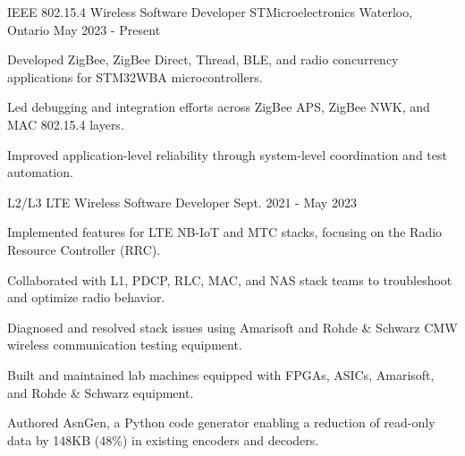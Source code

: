 
\begin{cventries}

\cventry
    {IEEE 802.15.4 Wireless Software Developer } %
    {STMicroelectronics } %
    {Waterloo, Ontario} %
    {May 2023 - Present} %
    {
      \begin{cvitems} %
        \item {Developed ZigBee, ZigBee Direct, Thread, BLE, and radio concurrency applications for STM32WBA microcontrollers.}
        \item {Led debugging and integration efforts across ZigBee APS, ZigBee NWK, and MAC 802.15.4 layers.}
        \item {Improved application-level reliability through system-level coordination and test automation.}
      \end{cvitems}
    }

  \cventry
    {L2/L3 LTE Wireless Software Developer } %
    {} %
    {} %
    {Sept. 2021 - May 2023} %
    {
      \begin{cvitems}
        \item {Implemented features for LTE NB-IoT and MTC stacks, focusing on the Radio Resource Controller (RRC).}
        \item {Collaborated with L1, PDCP, RLC, MAC, and NAS stack teams to troubleshoot and optimize radio behavior.}
        \item {Diagnosed and resolved stack issues using Amarisoft and Rohde \& Schwarz CMW wireless communication testing equipment.}
        \item {Built and maintained lab machines equipped with FPGAs, ASICs, Amarisoft, and Rohde \& Schwarz equipment.}
        \item {Authored AsnGen, a Python code generator enabling a reduction of read-only data by 148KB (48\%) in existing encoders and decoders.}
      \end{cvitems}
    }


\end{cventries}
